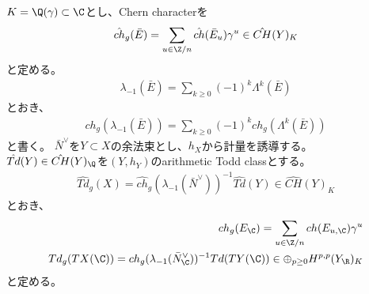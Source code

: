 \documentclass{jsarticle}
\begin{document}
$K=\Q(\gamma)\subset\C$とし、Chern characterを
\begin{align*}
\hat{ch}_g(\bar{E})=\sum_{u\in\Z/n}\hat{ch}(\bar{E}_u)\gamma^u \in \hat{CH}(Y)_K
\end{align*}
と定める。
\begin{align*}
\lambda_{-1}(\bar{E})=\sum_{k\geq0}(-1)^k\Lambda^k(\bar{E})
\end{align*}
とおき、
\begin{align*}
ch_g(\lambda_{-1}(\bar{E}))=\sum_{k\geq0}(-1)^kch_g(\Lambda^k(\bar{E}))
\end{align*}
と書く。
$\bar{N}^\vee$を$Y \subset X$の余法束とし、$h_X$から計量を誘導する。
$\hat{Td}(Y) \in \hat{CH}(Y)_\Q$を$(Y,h_Y)$のarithmetic Todd classとする。
\begin{align*}
\hat{Td}_g(X)=\hat{ch}_g(\lambda_{-1}(\bar{N}^\vee))^{-1}\hat{Td}(Y)\in\hat{CH}(Y)_K
\end{align*}
とおき、
\begin{align*}
ch_g(E_\C)=\sum_{u\in\Z/n}ch(E_{u,\C})\gamma^u\\
Td_g(TX(\C))=ch_g(\lambda_{-1}(\bar{N}^\vee_\C))^{-1}Td(TY(\C))\in\oplus_{p\geq0}H^{p,p}(Y_\R)_K
\end{align*}
と定める。

\begin{thm}[Theorem 3.1]
\end{thm}
\end{document}
